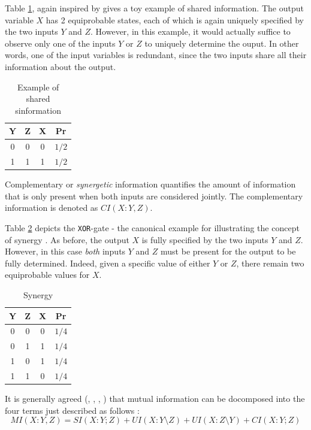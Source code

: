 \documentclass[12pt]{article}
\begin{document}
Table \ref{table:2}, again inspired by \cite{pid-synergy} gives a toy example of shared information. The output variable $X$ has 2 equiprobable states, each of which is again uniquely specified by the two inputs $Y$ and $Z$. However, in this example, it would actually suffice to observe only one of the inputs $Y$ or $Z$ to uniquely determine the ouput. In other words, one of the input variables is redundant, since the two inputs share all their information about the output.

\begin{table}[h!]
\centering
\begin{tabular}{|c c |c|c|}
	\hline
	Y & Z & X & Pr\\ 
	\hline
	0 & 0 & 0 & $1/2$\\
	1 & 1 & 1 & $1/2$\\ 
	\hline
\end{tabular}
\caption{Example of shared sinformation}
\label{table:2}
\end{table}

Complementary or \textit{synergetic} information quantifies the amount of information that is only present when both inputs are considered jointly. The complementary information is denoted as $CI(X:Y,Z)$. 

Table \ref{table:3} depicts the \texttt{XOR}-gate - the canonical example for illustrating the concept of synergy \cite{pid-synergy}. As before, the output $X$ is fully specified by the two inputs $Y$ and $Z$. However, in this case \textit{both} inputs $Y$ and $Z$ must be present for the output to be fully determined. Indeed, given a specific value of either $Y$ or $Z$, there remain two equiprobable values for $X$. 

\begin{table}[h!]
\centering
\begin{tabular}{|c c |c|c|}
	\hline
	Y & Z & X & Pr\\ 
	\hline
	0 & 0 & 0 & $1/4$ \\
	0 & 1 & 1 & $1/4$ \\ 
	1 & 0 & 1 & $1/4$ \\ 
	1 & 1 & 0 & $1/4$ \\ 
	\hline
\end{tabular}
\caption{Synergy}
\label{table:3}
\end{table}

It is generally agreed (\cite{williams-beer}, \cite{bertschinger}, \cite{pid-redundant}, \cite{pid-synergy}) that mutual information can be docomposed into the four terms just described as follows \cite{pid-goal-functions}:
\begin{equation}
MI(X:Y,Z) = SI(X:Y;Z) + UI(X:Y \setminus Z) + UI(X:Z \setminus Y) + CI(X:Y;Z)
\label{eq:pid}
\end{equation}
\end{document}
